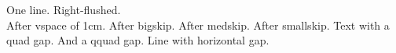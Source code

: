 \documentclass{article}
\begin{document}
\noindent One line. \hfill Right-flushed. \\
\vspace{1cm}
After vspace of 1cm.
\bigskip
After bigskip.
\medskip
After medskip.
\smallskip
After smallskip.
Text with \quad a quad gap. And \qquad a qquad gap.
Line with \hspace{2em} horizontal gap.
\end{document}
